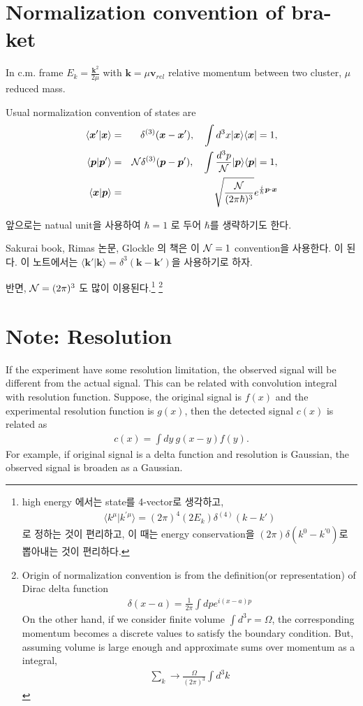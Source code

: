 \documentclass[10pt]{book}
\def\bm{\boldsymbol}
\newcommand{\bea}{\begin{eqnarray}}
\newcommand{\eea}{\end{eqnarray}}
\newcommand{\no}{\nonumber \\}
\def\vp{{\bm p}}
\def\vk{{\bm k}}
\def\vx{{\bm x}}
\def\la{\langle}
\def\ra{\rangle}
\begin{document}
\section{Normalization convention of bra-ket}
\label{sec:normalization}
In c.m. frame $E_k=\frac{\vk^2}{2\mu}$
with $\vk=\mu {\bm v}_{rel}$ relative momentum
between two cluster, $\mu$ reduced mass.

      Usual normalization convention of states are
      \bea 
      \la \vx'|\vx\ra &=&\delta^{(3)}(\vx-\vx'),\quad 
      \int d^3x |\vx\ra \la \vx| =1,\no 
      \la \vp|\vp'\ra &=&{\cal N} \delta^{(3)}(\vp-\vp'),\quad 
      \int \frac{d^3p}{{\cal N}}|\vp\ra \la \vp| =1,\no 
      \la \vx|\vp\ra &=& \sqrt{\frac{{\cal N}}{(2\pi\hbar)^3}} e^{\frac{i}{\hbar}\vp\cdot\vx}
      \eea 
     
    앞으로는 natual unit을 사용하여 $\hbar=1$ 로 두어 $\hbar$를 생략하기도 한다. 
    
Sakurai book, Rimas 논문, Glockle 의 책은 이 ${\cal N}=1$ convention을 사용한다.
이 된다. 이 노트에서는 $\la \vk'|\vk\ra=\delta^3(\vk-\vk')$을
사용하기로 하자.

반면, ${\cal N}=(2\pi)^3$ 도 많이 이용된다.\footnote{ high energy 에서는 state를 4-vector로
생각하고,
\bea
\la k^\mu | k^{'\mu}\ra=(2\pi)^4(2E_k)\delta^{(4)}(k-k')
\eea
로 정하는 것이 편리하고, 이 때는 energy conservation을
$(2\pi)\delta(k^0-k^{'0})$로 뽑아내는 것이 편리하다. }
\footnote{Origin of normalization convention is
from the definition(or representation) of Dirac delta function 
\bea 
\delta(x-a)=\frac{1}{2\pi}\int dp e^{i(x-a)p}
\eea 
On the other hand, if we consider finite volume $\int d^3r =\Omega$,
 the corresponding momentum becomes a discrete values to satisfy 
 the boundary condition. But, assuming volume is large enough and 
 approximate sums over momentum as a integral,
 \bea 
 \sum_{k} \rightarrow \frac{\Omega}{(2\pi)^3}\int d^3 k
 \eea 
}

\section{Note: Resolution}

If the experiment have some resolution limitation, the observed signal will be 
different from the actual signal. This can be related with convolution integral with 
resolution function. Suppose, the original signal is $f(x)$ and the 
experimental resolution function is $g(x)$, then the detected signal $c(x)$
is related as 
\bea 
c(x) = \int d y\ g(x-y) f(y).
\eea 
For example, if original signal is a delta function and resolution is Gaussian,
the observed signal is broaden as a Gaussian. 
\end{document}
